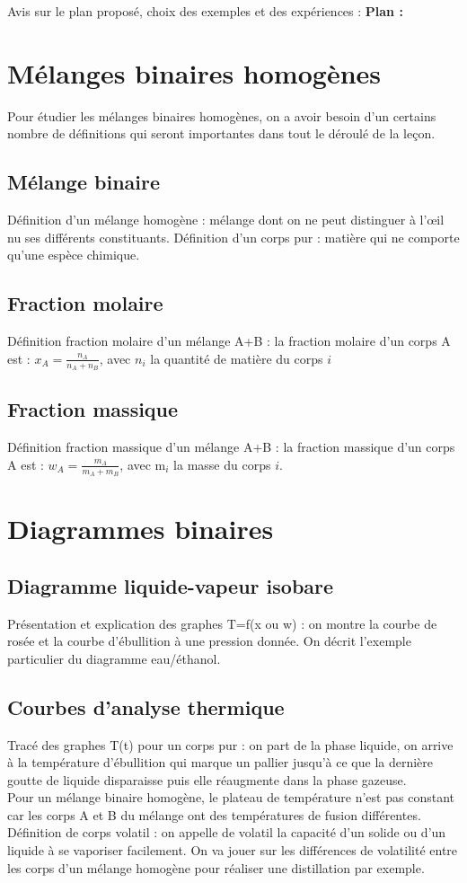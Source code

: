 \begin{reportBlock}{Avis sur le plan proposé, choix des exemples et des expériences : }
\textbf{Plan :}\\
\section{Mélanges binaires homogènes}
Pour étudier les mélanges binaires homogènes, on a avoir besoin d'un certains nombre de définitions qui seront importantes dans tout le déroulé de la leçon.
\subsection{Mélange binaire}
Définition d'un mélange homogène : mélange dont on ne peut distinguer à l'\oe il nu ses différents constituants.
Définition d'un corps pur : matière qui ne comporte qu'une espèce chimique.
\subsection{Fraction molaire}
Définition fraction molaire d'un mélange A+B : la fraction molaire d'un corps A est : $x_{A}=\frac{n_A}{n_A+n_B}$, avec $n_i$ la quantité de matière du corps $i$
\subsection{Fraction massique}
Définition fraction massique d'un mélange A+B : la fraction massique d'un corps A est : $w_{A}=\frac{m_A}{m_A+m_B}$, avec m$_i$ la masse du corps $i$.
\section{Diagrammes binaires}
\subsection{Diagramme liquide-vapeur isobare}
Présentation et explication des graphes T=f(x ou w) : on montre la courbe de rosée et la courbe d'ébullition à une pression donnée. On décrit l'exemple particulier du diagramme eau/éthanol.
\subsection{Courbes d'analyse thermique}
Tracé des graphes T(t) pour un corps pur : on part de la phase liquide, on arrive à la température d'ébullition qui marque un pallier jusqu'à ce que la dernière goutte de liquide disparaisse puis elle réaugmente dans la phase gazeuse.\\
Pour un mélange binaire homogène, le plateau de température n'est pas constant car les corps A et B du mélange ont des températures de fusion différentes.\\ 
Définition de corps volatil : on appelle de volatil la capacité d'un solide ou d'un liquide à se vaporiser facilement. On va jouer sur les différences de volatilité entre les corps d'un mélange homogène pour réaliser une distillation par exemple.

\end{reportBlock}
